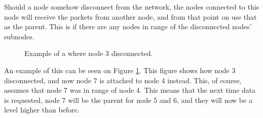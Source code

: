 Should a node somehow disconnect from the network, the nodes connected to this node will receive the packets from another node, and from that point on use that as the parent. This is  if there are any nodes in range of the disconnected nodes' subnodes. 

\begin{figure}[!h]
	\centering
	\caption{Example of a where node 3 disconnected.}
	\label{fig:prottree2}
\end{figure}

An example of this can be seen on Figure \ref{fig:prottree2}. This figure shows how node 3 disconnected, and now node 7 is attached to node 4 instead. This, of course, assumes that node 7 was in range of node 4.
This means that the next time data is requested, node 7 will be the parent for node 5 and 6, and they will now be a level higher than before.


